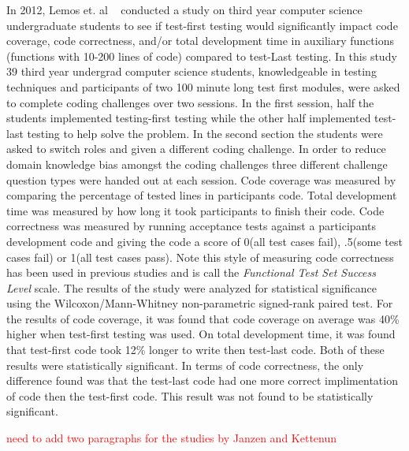 \documentclass{sig-alternate}
\newcommand{\mycomment}[1]{\textcolor{red}{#1}}
\begin{document}
In 2012, Lemos et. al ~\cite{Lemos:2012} conducted a study on third year computer science undergraduate students to see if test-first testing would significantly impact code coverage,  code correctness, and/or total development time in auxiliary functions (functions with 10-200 lines of code) compared to test-Last testing.   In this study 39 third year undergrad computer science students, knowledgeable in testing techniques and participants of two 100 minute long test first modules, were asked to complete coding challenges over two sessions.  In the first session, half the students implemented testing-first testing while the other half implemented test-last testing to help solve the problem.  In the second section the students were asked to switch roles and given a different coding challenge.  In order to reduce domain knowledge bias amongst the coding challenges three different challenge question types were handed out at each session.  Code coverage was measured by comparing the percentage of tested lines in participants code.  Total development time was measured by how long it took participants to finish their code.  Code correctness was measured by running acceptance tests against a participants development code and giving the code a score of 0(all test cases fail), .5(some test cases fail) or 1(all test cases pass).  Note this style of measuring code correctness has been used in previous studies and is call the \textit{Functional Test Set Success Level} scale.   The results of the study were analyzed for statistical significance using the Wilcoxon/Mann-Whitney non-parametric signed-rank paired test. For the results of code coverage, it was found that code coverage on average was 40\% higher when test-first testing was used.  On total development time, it was found that test-first code took 12\% longer to write then test-last code. Both of these results were statistically significant.  In terms of code correctness, the only difference found was that the test-last code had one more correct implimentation of code then the test-first code.  This result was not found to be statistically significant.
 
\mycomment{need to add two paragraphs for the studies by Janzen and Kettenun} 
\end{document}
